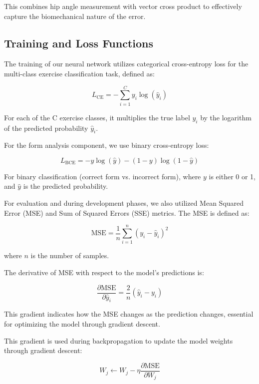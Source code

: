 \documentclass[11pt]{article}
\begin{document}
This combines hip angle measurement with vector cross product to effectively capture the biomechanical nature of the error.

\subsection{Training and Loss Functions}
The training of our neural network utilizes categorical cross-entropy loss for the multi-class exercise classification task, defined as:

\begin{equation}
L_{\text{CE}} = -\sum_{i=1}^{C} y_i \log(\hat{y}_i)
\end{equation}

For each of the C exercise classes, it multiplies the true label $y_i$ by the logarithm of the predicted probability $\hat{y}_i$.

For the form analysis component, we use binary cross-entropy loss:

\begin{equation}
L_{\text{BCE}} = -y \log(\hat{y}) - (1-y)\log(1-\hat{y})
\end{equation}

For binary classification (correct form vs. incorrect form), where $y$ is either 0 or 1, and $\hat{y}$ is the predicted probability.

For evaluation and during development phases, we also utilized Mean Squared Error (MSE) and Sum of Squared Errors (SSE) metrics. The MSE is defined as:

\begin{equation}
\text{MSE} = \frac{1}{n} \sum_{i=1}^{n} (y_i - \hat{y}_i)^2
\end{equation}

where $n$ is the number of samples.

The derivative of MSE with respect to the model's predictions is:

\begin{equation}
\frac{\partial \text{MSE}}{\partial \hat{y}_i} = \frac{2}{n}(\hat{y}_i - y_i)
\end{equation}

This gradient indicates how the MSE changes as the prediction changes, essential for optimizing the model through gradient descent.

This gradient is used during backpropagation to update the model weights through gradient descent:

\begin{equation}
W_j \leftarrow W_j - \eta \frac{\partial \text{MSE}}{\partial W_j}
\end{equation}
\end{document}
